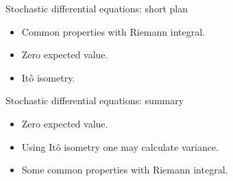 
\begin{frame} %

    
    \end{frame}
    
    
    \begin{frame}{Stochastic differential equations: short plan}
    
      \begin{itemize}[<+->]
        \item Common properties with Riemann integral.
        \item Zero expected value.
        \item Itô isometry.
      \end{itemize}
    
    \end{frame}


\begin{frame}{Stochastic differential equations: summary}
        
\begin{itemize}[<+->]
          \item \alert{Zero} expected value.
          \item Using \alert{Itô isometry} one may calculate variance.
          \item \alert{Some common properties} with Riemann integral.
\end{itemize}
        
\end{frame}
      
